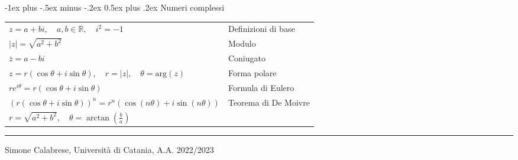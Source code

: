\documentclass[a4paper,10pt,landscape]{article}
\makeatletter
\renewcommand{\section}{\@startsection{section}{1}{0mm}%
                                {-1ex plus -.5ex minus -.2ex}%
                                {0.5ex plus .2ex}%
                                {\normalfont\large\bfseries}}
\makeatother
\begin{document}
\begin{multicols}{3}
\section{Numeri complessi} 
\vspace{1mm}
\begin{tabular}{l l}
    $ z = a + bi, \quad a, b \in \mathbb{R}, \quad i^2 = -1 $ & Definizioni di base \\
    $ |z| = \sqrt{a^2 + b^2} $ & Modulo \\
    $ \bar{z} = a - bi $ & Coniugato \\
    $ z = r(\cos \theta + i \sin \theta), \quad r = |z|, \quad \theta = \text{arg}(z) $ & Forma polare \\
    $ re^{i\theta} = r(\cos \theta + i \sin \theta) $ &   Formula di Eulero \\
    $ (r(\cos \theta + i \sin \theta))^n = r^n (\cos (n\theta) + i \sin (n\theta))$ & Teorema di De Moivre \\
    $ r = \sqrt{a^2 + b^2}, \quad \theta = \arctan\left(\frac{b}{a}\right) $ \\
\end{tabular}

\vfill
\hrule
\smallskip

\noindent Simone Calabrese, Università di Catania, A.A. 2022/2023 \hfill  \href{http://simonecalabrese.com/}{\color{blue}{simonecalabrese.com}}\\

\end{multicols}
\end{document}
